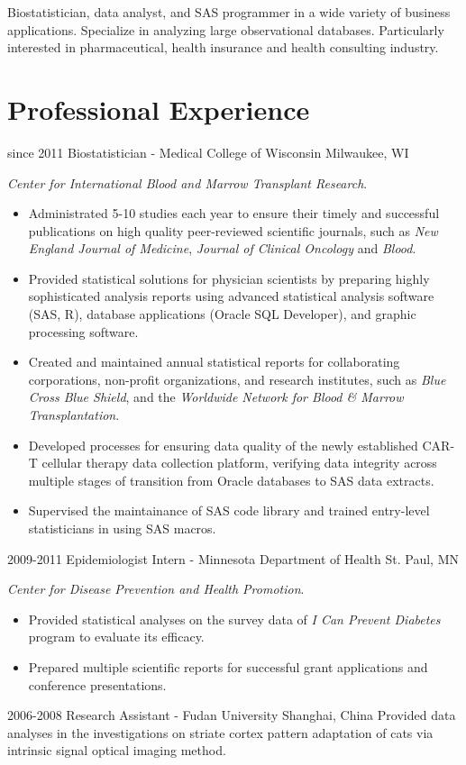 Biostatistician, data analyst, and SAS programmer in a wide variety of business applications. Specialize in analyzing large observational databases. Particularly interested in pharmaceutical, health insurance and health consulting industry.\\

\section{Professional Experience}

\begin{entrylist}
  \entry
    {since 2011}
    {Biostatistician - Medical College of Wisconsin}
    {Milwaukee, WI}
    {
    \textit{Center for International Blood and Marrow Transplant Research}.
    \begin{itemize}
      \item Administrated 5-10 studies each year to ensure their timely and successful publications on high quality peer-reviewed scientific journals, such as \textit{New England Journal of Medicine}, \textit{Journal of Clinical Oncology} and \textit{Blood}.
      \item Provided statistical solutions for physician scientists by preparing highly sophisticated analysis reports using advanced statistical analysis software (SAS, R), database applications (Oracle SQL Developer), and graphic processing software.
      \item Created and maintained annual statistical reports for collaborating corporations, non-profit organizations, and research institutes, such as \textit{Blue Cross Blue Shield}, and the \textit{Worldwide Network for Blood \& Marrow Transplantation}.
      \item Developed processes for ensuring data quality of the newly established CAR-T cellular therapy data collection platform, verifying data integrity across multiple stages of transition from Oracle databases to SAS data extracts.
      \item Supervised the maintainance of SAS code library and trained entry-level statisticians in using SAS macros.
    \end{itemize}
    }
  \entry
    {2009-2011}
    {Epidemiologist Intern - Minnesota Department of Health}
    {St. Paul, MN}
    {
    \textit{Center for Disease Prevention and Health Promotion}.
    \begin{itemize}
      \item Provided statistical analyses on the survey data of \textit{I Can Prevent Diabetes} program to evaluate its efficacy.
      \item Prepared multiple scientific reports for successful grant applications and conference presentations.
    \end{itemize}
    }
  \entry
    {2006-2008}
    {Research Assistant - Fudan University}
    {Shanghai, China}
    {Provided data analyses in the investigations on striate cortex pattern adaptation of cats via intrinsic signal optical imaging method.}
\end{entrylist}

